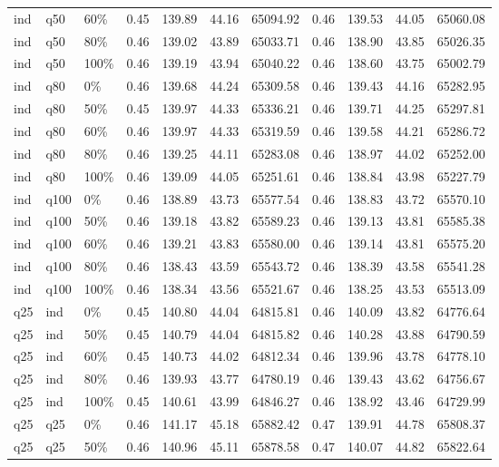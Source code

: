 \begin{longtable}{lllrrrrrrrr}
  ind & q50 & 60\% & 0.45 & 139.89 & 44.16 & 65094.92 & 0.46 & 139.53 & 44.05 & 65060.08 \\ 
  ind & q50 & 80\% & 0.46 & 139.02 & 43.89 & 65033.71 & 0.46 & 138.90 & 43.85 & 65026.35 \\ 
  ind & q50 & 100\% & 0.46 & 139.19 & 43.94 & 65040.22 & 0.46 & 138.60 & 43.75 & 65002.79 \\ 
  ind & q80 & 0\% & 0.46 & 139.68 & 44.24 & 65309.58 & 0.46 & 139.43 & 44.16 & 65282.95 \\ 
  ind & q80 & 50\% & 0.45 & 139.97 & 44.33 & 65336.21 & 0.46 & 139.71 & 44.25 & 65297.81 \\ 
  ind & q80 & 60\% & 0.46 & 139.97 & 44.33 & 65319.59 & 0.46 & 139.58 & 44.21 & 65286.72 \\ 
  ind & q80 & 80\% & 0.46 & 139.25 & 44.11 & 65283.08 & 0.46 & 138.97 & 44.02 & 65252.00 \\ 
  ind & q80 & 100\% & 0.46 & 139.09 & 44.05 & 65251.61 & 0.46 & 138.84 & 43.98 & 65227.79 \\ 
  ind & q100 & 0\% & 0.46 & 138.89 & 43.73 & 65577.54 & 0.46 & 138.83 & 43.72 & 65570.10 \\ 
  ind & q100 & 50\% & 0.46 & 139.18 & 43.82 & 65589.23 & 0.46 & 139.13 & 43.81 & 65585.38 \\ 
  ind & q100 & 60\% & 0.46 & 139.21 & 43.83 & 65580.00 & 0.46 & 139.14 & 43.81 & 65575.20 \\ 
  ind & q100 & 80\% & 0.46 & 138.43 & 43.59 & 65543.72 & 0.46 & 138.39 & 43.58 & 65541.28 \\ 
  ind & q100 & 100\% & 0.46 & 138.34 & 43.56 & 65521.67 & 0.46 & 138.25 & 43.53 & 65513.09 \\ 
  q25 & ind & 0\% & 0.45 & 140.80 & 44.04 & 64815.81 & 0.46 & 140.09 & 43.82 & 64776.64 \\ 
  q25 & ind & 50\% & 0.45 & 140.79 & 44.04 & 64815.82 & 0.46 & 140.28 & 43.88 & 64790.59 \\ 
  q25 & ind & 60\% & 0.45 & 140.73 & 44.02 & 64812.34 & 0.46 & 139.96 & 43.78 & 64778.10 \\ 
  q25 & ind & 80\% & 0.46 & 139.93 & 43.77 & 64780.19 & 0.46 & 139.43 & 43.62 & 64756.67 \\ 
  q25 & ind & 100\% & 0.45 & 140.61 & 43.99 & 64846.27 & 0.46 & 138.92 & 43.46 & 64729.99 \\ 
  q25 & q25 & 0\% & 0.46 & 141.17 & 45.18 & 65882.42 & 0.47 & 139.91 & 44.78 & 65808.37 \\ 
  q25 & q25 & 50\% & 0.46 & 140.96 & 45.11 & 65878.58 & 0.47 & 140.07 & 44.82 & 65822.64 \\ 

\end{longtable}
